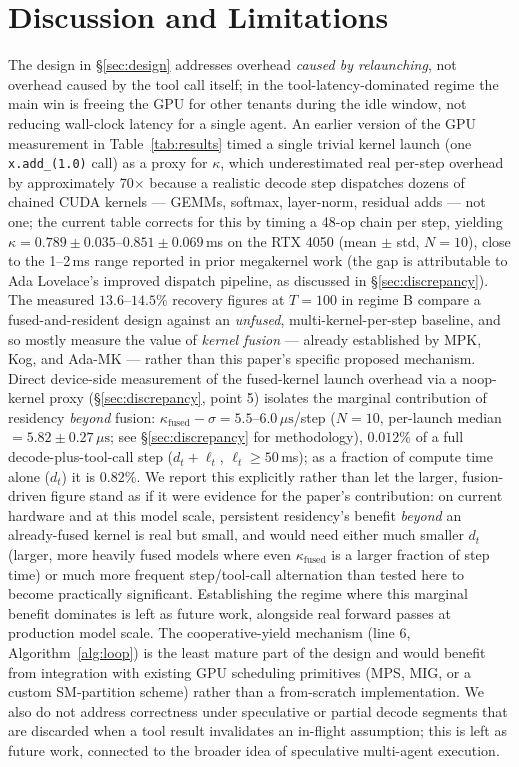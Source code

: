\documentclass{article}
\begin{document}
\section{Discussion and Limitations}

The design in \S\ref{sec:design} addresses overhead \emph{caused by
relaunching}, not overhead caused by the tool call itself; in the
tool-latency-dominated regime the main win is freeing the GPU for
other tenants during the idle window, not reducing wall-clock latency
for a single agent. An earlier version of the GPU measurement in
Table~\ref{tab:results} timed a single trivial kernel launch
(one \texttt{x.add\_(1.0)} call) as a proxy for $\kappa$, which
underestimated real per-step overhead by approximately 70$\times$
because a realistic decode step dispatches dozens of chained CUDA
kernels --- GEMMs, softmax, layer-norm, residual adds --- not one;
the current table corrects for this by timing a 48-op chain per step,
yielding $\kappa = 0.789\pm0.035$--$0.851\pm0.069$\,ms on the RTX 4050
(mean $\pm$ std, $N=10$), close to the
1--2\,ms range reported in prior megakernel work \citep{mpk2025,adamk2026}
(the gap is attributable to Ada Lovelace's improved dispatch pipeline,
as discussed in \S\ref{sec:discrepancy}). The measured $13.6$--$14.5\%$
recovery figures at $T=100$ in regime B compare a fused-and-resident
design against an \emph{unfused}, multi-kernel-per-step baseline, and
so mostly measure the value of \emph{kernel fusion} --- already
established by MPK, Kog, and Ada-MK \citep{mpk2025,kog2026,adamk2026}
--- rather than this paper's specific proposed mechanism. Direct
device-side measurement of the fused-kernel launch overhead via a
noop-kernel proxy (\S\ref{sec:discrepancy}, point 5) isolates the
marginal contribution of residency \emph{beyond} fusion:
$\kappa_{\text{fused}} - \sigma = 5.5$--$6.0\,\mu\text{s}$/step
($N=10$, per-launch median $= 5.82 \pm 0.27\,\mu\text{s}$; see
\S\ref{sec:discrepancy} for methodology), $0.012\%$ of a full
decode-plus-tool-call step ($d_t + \ell_t$, $\ell_t \geq 50$\,ms);
as a fraction of compute time alone ($d_t$) it is $0.82\%$. We report this explicitly rather than let the
larger, fusion-driven figure stand as if it were evidence for the
paper's contribution: on current hardware and at this model scale,
persistent residency's benefit \emph{beyond} an already-fused kernel
is real but small, and would need either much smaller $d_t$ (larger,
more heavily fused models where even $\kappa_{\text{fused}}$ is a
larger fraction of step time) or much more frequent step/tool-call
alternation than tested here to become practically significant.
Establishing the regime where this marginal benefit dominates is left
as future work, alongside real forward passes at production model
scale.
The cooperative-yield mechanism (line 6,
Algorithm~\ref{alg:loop}) is the least mature part of the design and
would benefit from integration with existing GPU scheduling
primitives (MPS, MIG, or a custom SM-partition scheme) rather than a
from-scratch implementation. We also do not address correctness under
speculative or partial decode segments that are discarded when a tool
result invalidates an in-flight assumption; this is left as future
work, connected to the broader idea of speculative multi-agent
execution.
\end{document}
